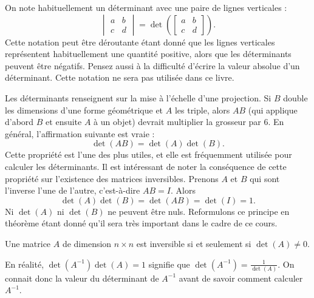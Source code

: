 On note habituellement un déterminant avec une paire de lignes verticales :
\begin{equation*}
\begin{vmatrix}
a & b \\
c & d
\end{vmatrix}
=
\det \left(
\begin{bmatrix}
a & b \\
c & d
\end{bmatrix}
\right) .
\end{equation*}
Cette notation peut être déroutante étant donné que les lignes verticales représentent habituellement une quantité positive, alors que les déterminants peuvent être négatifs. Pensez aussi à la difficulté d’écrire la valeur absolue d’un déterminant. Cette notation ne sera pas utilisée dans ce livre.

\medskip

Les déterminants renseignent sur la mise à l’échelle d’une projection. Si $B$ double les dimensions d’une forme géométrique et $A$ les triple, alors $AB$ (qui applique d’abord $B$ et ensuite $A$ à un objet) devrait multiplier la grosseur par $6$.  En général, l’affirmation suivante est vraie :
\begin{equation*}
\det(AB) = \det(A)\det(B) .
\end{equation*}
Cette propriété est l'une des plus utiles, et elle est fréquemment utilisée pour calculer les déterminants. Il est intéressant de noter la conséquence de cette propriété sur l’existence des matrices inversibles. Prenons $A$ et $B$ qui sont l’inverse l’une de l’autre, c’est-à-dire $AB=I$.  Alors
\begin{equation*}
\det(A)\det(B) = \det(AB) = \det(I) = 1 .
\end{equation*}
Ni $\det(A)$ ni $\det(B)$ ne peuvent être nuls. Reformulons ce principe en théorème étant donné qu’il sera très important dans le cadre de ce cours.

\begin{theorem}
Une matrice $A$ de dimension $n \times n$ est inversible si et seulement si $\det (A) \not= 0$.
\end{theorem}

En réalité, $\det(A^{-1}) \det(A) = 1$ signifie que $\det(A^{-1}) =
\frac{1}{\det(A)}$. On connait donc la valeur du déterminant de $A^{-1}$ avant de savoir comment calculer $A^{-1}$.

